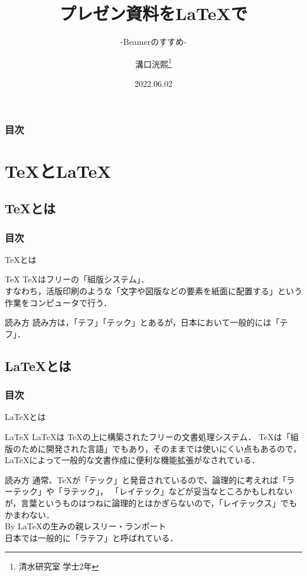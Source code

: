 \documentclass[dvipdfmx]{beamer}
\title[Cykut LT]{プレゼン資料を\LaTeX で}
\subtitle{-Beamerのすすめ-}
\author[K.MIZOGUCHI]{溝口洸熙\thanks{清水研究室 学士2年}}
\date{2022.06.02}
\institute[KUT]{高知工科大学 情報学群}
\begin{document}
\begin{frame}
    \titlepage
\end{frame}

\begin{frame}
    \frametitle{目次}
    \tableofcontents
\end{frame}

\section{\TeX と\LaTeX}
\subsection{\TeX とは}
\begin{frame}
    \frametitle{目次}
    \tableofcontents[currentsection,sectionstyle=show/shaded,subsectionstyle=show/shaded]
\end{frame}

\begin{frame}{\TeX とは}
    \begin{block}{\TeX}
        \TeX はフリーの「組版システム」．\\
        すなわち，活版印刷のような「文字や図版などの要素を紙面に配置する」という作業をコンピュータで行う．
    \end{block}
    \begin{alertblock}{読み方}
        読み方は，「テフ」「テック」とあるが，日本において一般的には「テフ」．
    \end{alertblock}
\end{frame}

\subsection{\LaTeX とは}
\begin{frame}
    \frametitle{目次}
    \tableofcontents[currentsection,sectionstyle=show/shaded,subsectionstyle=show/shaded]
\end{frame}

\begin{frame}{\LaTeX とは}
    \begin{block}{\LaTeX}
        \LaTeX は \TeX の上に構築されたフリーの文書処理システム．
        \TeX は「組版のために開発された言語」でもあり，そのままでは使いにくい点もあるので，
        \LaTeX によって一般的な文書作成に便利な機能拡張がなされている．
    \end{block}
    \begin{alertblock}{読み方}
        通常、\TeX が「テック」と発音されているので、論理的に考えれば「ラーテック」や「ラテック」，
        「レイテック」などが妥当なところかもしれないが，言葉というものはつねに論理的とはかぎらないので，「レイテックス」でもかまわない．\\
        By \LaTeX の生みの親レスリー・ランポート\\
        日本では一般的に「ラテフ」と呼ばれている．
    \end{alertblock}
\end{frame}
\end{document}
